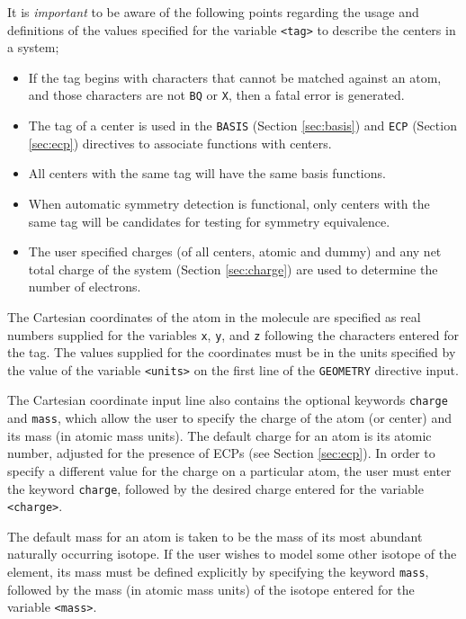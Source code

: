 It is {\em important} to be aware of the following points regarding the
usage and definitions of the values specified for the variable \verb+<tag>+
to describe the centers in a system;
\begin{itemize}
\item If the tag begins with characters that cannot be
  matched against an atom, and those characters are not \verb+BQ+ 
  or \verb+X+, then a fatal
  error is generated.
\item The tag of a center is used in the \verb+BASIS+ (Section
  \ref{sec:basis}) and \verb+ECP+ (Section \ref{sec:ecp}) directives
  to associate functions with centers.
\item All centers with the same tag will have the same basis
  functions.
\item When automatic symmetry detection is functional, only centers
  with the same tag will be candidates for testing for symmetry
  equivalence.
\item The user specified charges (of all centers, atomic and dummy)
  and any net total charge of the system (Section \ref{sec:charge}) are
  used to determine the number of electrons.
\end{itemize}

The Cartesian coordinates of the atom in the molecule are specified as
real numbers supplied for the variables \verb+x+, \verb+y+, and \verb+z+
following the characters entered for the tag.
The values supplied for the coordinates must be in the units specified
by the value of the variable \verb+<units>+ on the first line of
the \verb+GEOMETRY+ directive input.

The Cartesian coordinate input line also contains the optional
keywords \verb+charge+ and \verb+mass+, which allow the user to
specify the charge of the atom (or center) and its mass (in atomic
mass units).  The default charge for an atom is its atomic number,
adjusted for the presence of ECPs (see Section \ref{sec:ecp}).  In
order to specify a different value for the charge on a particular
atom, the user must enter the keyword \verb+charge+, followed by the
desired charge entered for the variable \verb+<charge>+.

The default mass for an atom is taken to be the mass of its most
abundant naturally occurring isotope.  If the user wishes to model
some other isotope of the element, its mass must be defined explicitly
by specifying the keyword \verb+mass+, followed by the mass (in atomic
mass units) of the isotope entered for the variable \verb+<mass>+.

